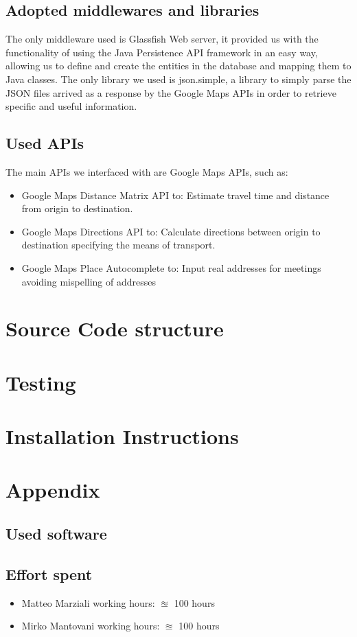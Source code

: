 \documentclass{article}
\begin{document}
\subsection{Adopted middlewares and libraries}
The only middleware used is Glassfish Web server, it provided us with the functionality of using the Java Persistence API framework in an easy way, allowing us to define and create the entities in the database and mapping them to Java classes.
The only library we used is json.simple, a library to simply parse the JSON files arrived as a response by the Google Maps APIs in order to retrieve specific and useful information.


\subsection{Used APIs}
The main APIs we interfaced with are Google Maps APIs, such as:
\begin{itemize}
\item Google Maps Distance Matrix API to:
Estimate travel time and distance from origin to destination.
\item Google Maps Directions API to:
Calculate directions between origin to destination specifying the means of transport.
\item Google Maps Place Autocomplete to: Input real addresses for meetings avoiding mispelling of addresses
\end{itemize}



\clearpage
\section{Source Code structure}

\clearpage
\section{Testing}

\clearpage
\section{Installation Instructions}




\clearpage
\section{Appendix}

\subsection{Used software}


\subsection{Effort spent}
\begin{itemize}

\item Matteo Marziali working hours:  $\approxeq$ 100 hours

\item Mirko Mantovani working hours:  $\approxeq$ 100 hours



\end{itemize}
\end{document}
